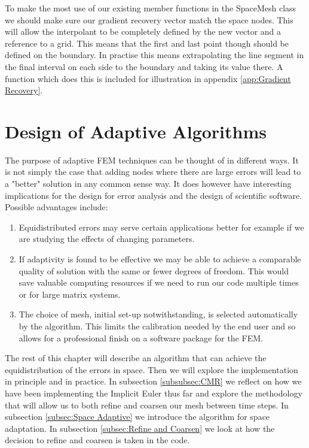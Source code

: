 \documentclass{uonmathreport}
\theoremstyle{definition}
\theoremstyle{problem}
\theoremstyle{theorem}
\begin{document}
To make the most use of our existing member functions in the SpaceMesh class we should make sure our gradient recovery vector match the space nodes. This will allow the interpolant to be completely defined by the new vector and a reference to a grid. This means that the first and last point though should be defined on the boundary. In practise this means extrapolating the line segment in the final interval on each side to the boundary and taking its value there. A function which does this is included for illustration in appendix \ref{app:Gradient Recovery}.






\newpage

\section{Design of Adaptive Algorithms} \label{sec:Adaptive}

The purpose of adaptive FEM techniques can be thought of in different ways. It is not simply the case that adding nodes where there are large errors will lead to a "better" solution in any common sense way. It does however have interesting implications for the design for error analysis and the design of scientific software. Possible advantages include:

\begin{enumerate}
\item Equidistributed errors may serve certain applications better for example if we are studying the effects of changing parameters. 

\item If adaptivity is found to be effective we may be able to achieve a comparable quality of solution with the same or fewer degrees of freedom. This would save valuable computing resources if we need to run our code multiple times or for large matrix systems. 

\item The choice of mesh, initial set-up notwithstanding, is selected automatically by the algorithm. This limits the calibration needed by the end user and so allows for a professional finish on a software package for the FEM. 
\end{enumerate}

The rest of this chapter will describe an algorithm that can achieve the equidistribution of the errors in space. Then we will explore the implementation in principle and in practice. In subsection \ref{subsubsec:CMR} we reflect on how we have been implementing the Implicit Euler thus far and explore the methodology that will allow us to both refine and coarsen our mesh between time steps. In subsection \ref{subsec:Space Adaptive} we introduce the algorithm for space adaptation. In subsection \ref{subsec:Refine and Coarsen} we look at how the decision to refine and coarsen is taken in the code.  
\end{document}
